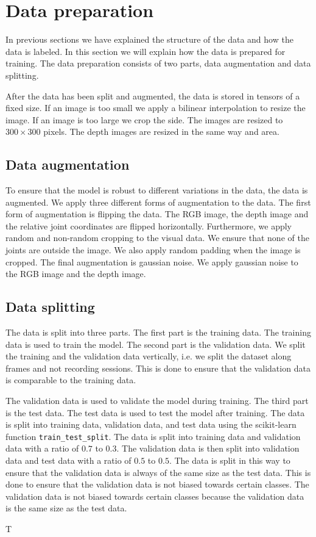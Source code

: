 \section{Data preparation}
\label{sec:data_preparation}

In previous sections we have explained the structure of the data and how the data is labeled. In this section we will explain how the data is prepared for training. The data preparation consists of two parts, data augmentation and data splitting.

After the data has been split and augmented, the data is stored in tensors of a fixed size. If an image is too small we apply a bilinear interpolation to resize the image. If an image is too large we crop the side. The images are resized to $300 \times 300$ pixels. The depth images are resized in the same way and area.

\subsection{Data augmentation}

To ensure that the model is robust to different variations in the data, the data is augmented. We apply three different forms of augmentation to the data. The first form of augmentation is flipping the data. The RGB image, the depth image and the relative joint coordinates are flipped horizontally. Furthermore, we apply random and non-random cropping to the visual data. We ensure that none of the joints are outside the image. We also apply random padding when the image is cropped. The final augmentation is gaussian noise. We apply gaussian noise to the RGB image and the depth image.

\subsection{Data splitting}

The data is split into three parts. The first part is the training data. The training data is used to train the model. The second part is the validation data. We split the training and the validation data vertically, i.e. we split the dataset along frames and not recording sessions. This is done to ensure that the validation data is comparable to the training data. 

The validation data is used to validate the model during training. The third part is the test data. The test data is used to test the model after training. The data is split into training data, validation data, and test data using the scikit-learn function \texttt{train\_test\_split}. The data is split into training data and validation data with a ratio of $0.7$ to $0.3$. The validation data is then split into validation data and test data with a ratio of $0.5$ to $0.5$. The data is split in this way to ensure that the validation data is always of the same size as the test data. This is done to ensure that the validation data is not biased towards certain classes. The validation data is not biased towards certain classes because the validation data is the same size as the test data. 

T